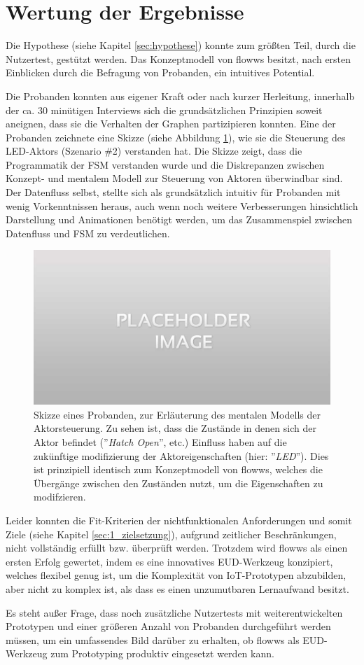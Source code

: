 \section{Wertung der Ergebnisse}
Die Hypothese (siehe Kapitel \ref{sec:hypothese}) konnte zum größten Teil, durch die Nutzertest, gestützt werden. Das Konzeptmodell von flowws besitzt, nach ersten Einblicken durch die Befragung von Probanden, ein intuitives Potential.

Die Probanden konnten aus eigener Kraft oder nach kurzer Herleitung, innerhalb der ca. 30 minütigen Interviews sich die grundsätzlichen Prinzipien soweit aneignen, dass sie die Verhalten der Graphen partizipieren konnten. Eine der Probanden zeichnete eine Skizze (siehe Abbildung \ref{fig:enduserskizze}), wie sie die Steuerung des LED-Aktors (Szenario \#2) verstanden hat. Die Skizze zeigt, dass die Programmatik der \ac{FSM} verstanden wurde und die Diskrepanzen zwischen Konzept- und mentalem Modell zur Steuerung von Aktoren überwindbar sind. Der Datenfluss selbst, stellte sich als grundsätzlich intuitiv für Probanden mit wenig Vorkenntnissen heraus, auch wenn noch weitere Verbesserungen hinsichtlich Darstellung und Animationen benötigt werden, um das Zusammenspiel zwischen Datenfluss und \ac{FSM} zu verdeutlichen.

\begin{figure}[h]
    \centering
    \includegraphics[width=.7\textwidth]{bilder/placeholder.jpg}
    \caption{Skizze eines Probanden, zur Erläuterung des mentalen Modells der Aktorsteuerung. Zu sehen ist, dass die Zustände in denen sich der Aktor befindet (''\textit{Hatch Open}'', etc.) Einfluss haben auf die zukünftige modifizierung der Aktoreigenschaften (hier: ''\textit{LED}'').  Dies ist prinzipiell identisch zum Konzeptmodell von flowws, welches die Übergänge zwischen den Zuständen nutzt, um die Eigenschaften zu modifzieren.}
    \label{fig:enduserskizze}
\end{figure}

Leider konnten die Fit-Kriterien der nichtfunktionalen Anforderungen und somit Ziele (siehe Kapitel \ref{sec:1_zielsetzung}), aufgrund zeitlicher Beschränkungen, nicht vollständig erfüllt bzw. überprüft werden. Trotzdem wird flowws als einen ersten Erfolg gewertet, indem es eine innovatives \ac{EUD}-Werkzeug konzipiert, welches flexibel genug ist, um die Komplexität von \ac{IoT}-Prototypen abzubilden, aber nicht zu komplex ist, als dass es einen unzumutbaren Lernaufwand besitzt.  

Es steht außer Frage, dass noch zusätzliche Nutzertests mit weiterentwickelten Prototypen und einer größeren Anzahl von Probanden durchgeführt werden müssen, um ein umfassendes Bild darüber zu erhalten, ob flowws als \ac{EUD}-Werkzeug zum Prototyping produktiv eingesetzt werden kann. 